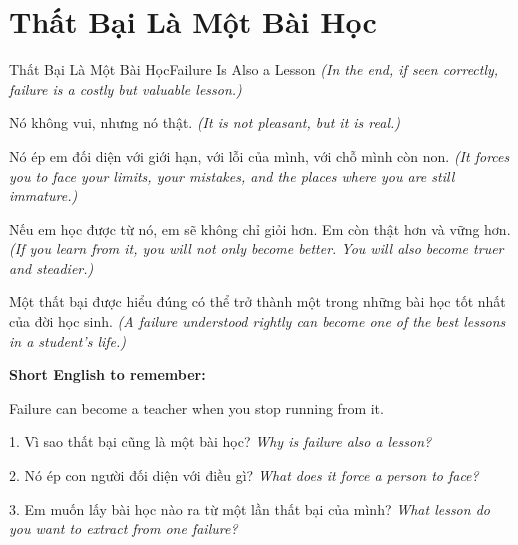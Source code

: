 \section{Thất Bại Là Một Bài Học}
\begin{truyen}{Thất Bại Là Một Bài Học}{Failure Is Also a Lesson}
\textit{(In the end, if seen correctly, failure is a costly but valuable lesson.)}

Nó không vui, nhưng nó thật.
\textit{(It is not pleasant, but it is real.)}

Nó ép em đối diện với giới hạn, với lỗi của mình, với chỗ mình còn non.
\textit{(It forces you to face your limits, your mistakes, and the places where you are still immature.)}

Nếu em học được từ nó, em sẽ không chỉ giỏi hơn. Em còn thật hơn và vững hơn.
\textit{(If you learn from it, you will not only become better. You will also become truer and steadier.)}
\end{truyen}

\begin{baihoc}
Một thất bại được hiểu đúng có thể trở thành một trong những bài học tốt nhất của đời học sinh.
\textit{(A failure understood rightly can become one of the best lessons in a student's life.)}
\end{baihoc}

\begin{ghinhoanh}
\textbf{Short English to remember:}

Failure can become a teacher when you stop running from it.

\end{ghinhoanh}

\begin{tuhocnhanh}
1. Vì sao thất bại cũng là một bài học? \textit{Why is failure also a lesson?}

2. Nó ép con người đối diện với điều gì? \textit{What does it force a person to face?}

3. Em muốn lấy bài học nào ra từ một lần thất bại của mình? \textit{What lesson do you want to extract from one failure?}
\end{tuhocnhanh}
\ngancach
